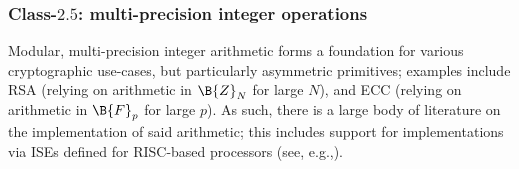 %
%
%
%




\subsubsection{Class-$2.5$: multi-precision integer operations}
\label{sec:bg:feature:2:5}

%
%

Modular, multi-precision integer arithmetic forms a foundation for various
cryptographic use-cases, but particularly asymmetric primitives; examples 
include
RSA (relying on arithmetic in $\B{Z}_N$ for large $N$),
and
ECC (relying on arithmetic in $\B{F}_p$ for large $p$).
As such, there is a large body of literature on the implementation of said 
arithmetic; this includes support for implementations via ISEs defined for 
RISC-based processors
(see, e.g.,\cite{SCARV:GroKam:03,SCARV:GroKam:04}).

